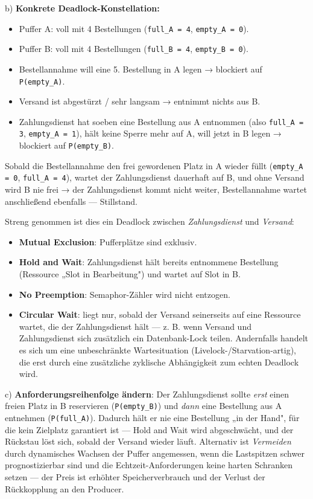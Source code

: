\documentclass[11pt, a4paper]{article}
\begin{document}
b) \textbf{Konkrete Deadlock-Konstellation:}

\begin{itemize}
  \item Puffer A: voll mit 4 Bestellungen (\texttt{full\_A = 4}, \texttt{empty\_A = 0}).
  \item Puffer B: voll mit 4 Bestellungen (\texttt{full\_B = 4}, \texttt{empty\_B = 0}).
  \item Bestellannahme will eine 5. Bestellung in A legen → blockiert auf \texttt{P(empty\_A)}.
  \item Versand ist abgestürzt / sehr langsam → entnimmt nichts aus B.
  \item Zahlungsdienst hat soeben eine Bestellung aus A entnommen (also \texttt{full\_A = 3}, \texttt{empty\_A = 1}), hält keine Sperre mehr auf A, will jetzt in B legen → blockiert auf \texttt{P(empty\_B)}.
\end{itemize}

Sobald die Bestellannahme den frei gewordenen Platz in A wieder füllt (\texttt{empty\_A = 0}, \texttt{full\_A = 4}), wartet der Zahlungsdienst dauerhaft auf B, und ohne Versand wird B nie frei → der Zahlungsdienst kommt nicht weiter, Bestellannahme wartet anschließend ebenfalls — Stillstand.


Streng genommen ist dies ein Deadlock zwischen \textit{Zahlungsdienst} und \textit{Versand}:

\begin{itemize}
  \item \textbf{Mutual Exclusion}: Pufferplätze sind exklusiv.
  \item \textbf{Hold and Wait}: Zahlungsdienst hält bereits entnommene Bestellung (Ressource „Slot in Bearbeitung") und wartet auf Slot in B.
  \item \textbf{No Preemption}: Semaphor-Zähler wird nicht entzogen.
  \item \textbf{Circular Wait}: liegt nur, sobald der Versand seinerseits auf eine Ressource wartet, die der Zahlungsdienst hält — z. B. wenn Versand und Zahlungsdienst sich zusätzlich ein Datenbank-Lock teilen. Andernfalls handelt es sich um eine unbeschränkte Wartesituation (Livelock-/Starvation-artig), die erst durch eine zusätzliche zyklische Abhängigkeit zum echten Deadlock wird.
\end{itemize}

c) \textbf{Anforderungsreihenfolge ändern}: Der Zahlungsdienst sollte \textit{erst} einen freien Platz in B reservieren (\texttt{P(empty\_B)}) und \textit{dann} eine Bestellung aus A entnehmen (\texttt{P(full\_A)}). Dadurch hält er nie eine Bestellung „in der Hand", für die kein Zielplatz garantiert ist — Hold and Wait wird abgeschwächt, und der Rückstau löst sich, sobald der Versand wieder läuft. Alternativ ist \textit{Vermeiden} durch dynamisches Wachsen der Puffer angemessen, wenn die Lastspitzen schwer prognostizierbar sind und die Echtzeit-Anforderungen keine harten Schranken setzen — der Preis ist erhöhter Speicherverbrauch und der Verlust der Rückkopplung an den Producer.





\end{document}
